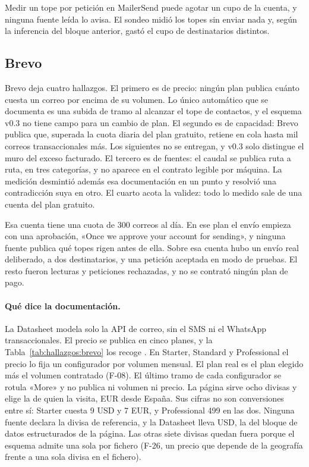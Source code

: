 Medir un tope por petición en MailerSend puede agotar un cupo de la cuenta, y ninguna
fuente leída lo avisa. El sondeo midió los topes sin enviar nada y, según la inferencia
del bloque anterior, gastó el cupo de destinatarios distintos.

\subsection{Brevo}
\label{subsec:hallazgos:brevo}

Brevo \citep{brevopricing,brevodocs} deja cuatro hallazgos. El primero es
de precio: ningún plan publica cuánto cuesta un correo por encima de su
volumen. Lo único automático que se documenta es una subida de tramo al alcanzar el tope de contactos, y el esquema v0.3 no tiene campo para un
cambio de plan. El segundo es de capacidad: Brevo publica que, superada la cuota diaria del
plan gratuito, retiene en cola hasta mil correos transaccionales
más. Los siguientes no se entregan, y v0.3 solo distingue el muro del exceso facturado. El tercero es de fuentes: el caudal se publica ruta a ruta, en tres categorías, y no aparece en el contrato legible por máquina. La medición
desmintió además esa documentación en un punto y resolvió una
contradicción suya en otro. El cuarto acota la validez: todo lo medido
sale de una cuenta del plan gratuito.

Esa cuenta tiene una cuota de 300 correos al día. En ese plan el envío
empieza con una aprobación, «Once we approve your account for sending», y
ninguna fuente publica qué topes rigen antes de ella. Sobre esa cuenta hubo
un envío real deliberado, a dos destinatarios, y una petición aceptada en
modo de pruebas. El resto fueron lecturas y peticiones rechazadas, y no se
contrató ningún plan de pago.

\paragraph{Qué dice la documentación.} La Datasheet modela solo la API de
correo, sin el SMS ni el WhatsApp transaccionales. El precio se publica en
cinco planes, y la Tabla~\ref{tab:hallazgos:brevo} los recoge
\citep{brevopricing}. En Starter, Standard y Professional el precio lo fija
un configurador por volumen mensual. El plan real es el plan elegido más el
volumen contratado (F-08). El último tramo de cada configurador se rotula
«More» y no publica ni volumen ni precio. La página sirve ocho divisas y
elige la de quien la visita, EUR desde España. Sus cifras no son
conversiones entre sí: Starter cuesta 9 USD y 7 EUR, y Professional 499 en
las dos. Ninguna fuente declara la divisa de referencia, y la Datasheet
lleva USD, la del bloque de datos estructurados de la página. Las otras
siete divisas quedan fuera porque el esquema admite una sola por fichero
(F-26, un precio que depende de la geografía frente a una sola divisa en el
fichero).

